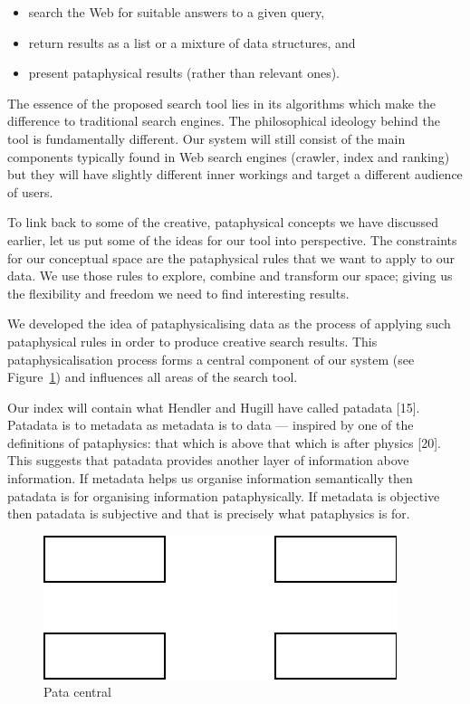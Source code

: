 \begin{itemize}
  \item search the Web for suitable answers to a given query,
  \item return results as a list or a mixture of data structures, and
  \item present pataphysical results (rather than relevant ones).
\end{itemize}

The essence of the proposed search tool lies in its algorithms which make the difference to traditional search engines. The philosophical ideology behind the tool is fundamentally different. Our system will still consist of the main components typically found in Web search engines (crawler, index and ranking) but they will have slightly different inner workings and target a different audience of users.

To link back to some of the creative, pataphysical concepts we have discussed earlier, let us put some of the ideas for our tool into perspective. The constraints for our conceptual space are the pataphysical rules that we want to apply to our data. We use those rules to explore, combine and transform our space; giving us the flexibility and freedom we need to find interesting results.

We developed the idea of pataphysicalising data as the process of applying such pataphysical rules in order to produce creative search results. This pataphysicalisation process forms a central component of our system (see Figure~\ref{fig:patasearch01}) and influences all areas of the search tool.

Our index will contain what Hendler and Hugill have called patadata [15].  Patadata is to metadata as metadata is to data --- inspired by one of the definitions of pataphysics: that which is above that which is after physics [20]. This suggests that patadata provides another layer of information above information.  If metadata helps us organise information semantically then patadata is for organising information pataphysically. If metadata is objective then patadata is subjective and that is precisely what pataphysics is for.


\begin{figure}[htb] %
  \centering
  \includegraphics[width=\linewidth]{images/patasearch01}
\caption[Pata central]{Pata central}
\label{fig:patasearch01}
\end{figure}

